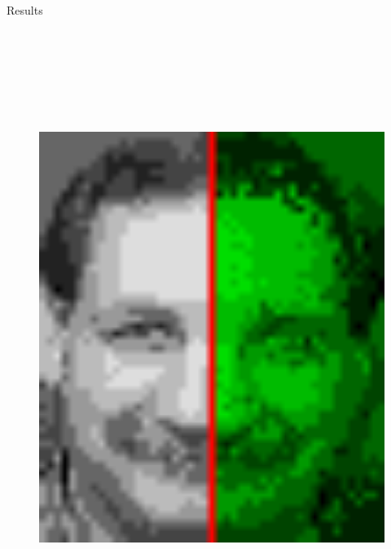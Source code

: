\documentclass[final,hyperref={pdfpagelabels=false},notheorems]{beamer}
\theoremstyle{thesisstyle}
\begin{document}
\begin{frame}[t]
\begin{columns}[t]
\begin{column}{.505\textwidth}
\begin{block}{Results}
      \begin{figure}[h]
        \centering\includegraphics[height=20cm]{imgs/gens_cmpl.png}

\end{figure}
\end{block}
\end{column}
\end{columns}
\end{frame}
\end{document}
